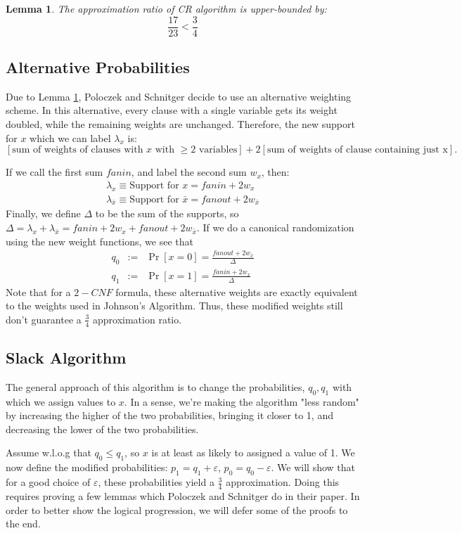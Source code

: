 \documentclass[11pt,letter]{article}
\newtheorem{lemma}{Lemma}
\begin{document}
\begin{lemma}
\label{L:1}
The approximation ratio of CR algorithm is upper-bounded by:
$$\frac{17}{23} < \frac{3}{4}$$

\end{lemma} 

\subsection{Alternative Probabilities}
Due to Lemma \ref{L:1}, Poloczek and Schnitger decide to use an alternative weighting scheme. In this alternative, every clause with a single variable gets its weight doubled, while the remaining weights are unchanged. Therefore, the new support for $x$ which we can label $\lambda_x$ is:
$$[\text{sum of weights of clauses with $x$ with $\ge 2$ variables}] + 2[\text{sum of weights of clause containing just x}].$$

If we call the first sum $fanin$, and label the second sum $w_x$, then:
\begin{eqnarray*}
\lambda_x \equiv \text{Support for } x = fanin + 2w_x\\
\lambda_{\bar{x}} \equiv \text{Support for } \bar{x} = fanout + 2w_{\bar{x}}
\end{eqnarray*}
Finally, we define $\Delta$ to be the sum of the supports, so $\Delta = \lambda_{x} + \lambda_{\bar{x}} = fanin + 2w_x + fanout + 2w_{\bar{x}}$. If we do a canonical randomization  using the new weight functions, we see that
\begin{eqnarray*}
q_0 &:=& \Pr[x=0] = \frac{fanout + 2w_{\bar{x}}}{\Delta}\\
q_1 &:=& \Pr[x=1] = \frac{fanin + 2w_x}{\Delta}
\end{eqnarray*}
Note that for a $2-CNF$ formula, these alternative weights are exactly equivalent to the weights used in Johnson's Algorithm. Thus, these modified weights still don't guarantee a $\frac{3}{4}$ approximation ratio.

\subsection{Slack Algorithm}
The general approach of this algorithm is to change the probabilities, $q_0, q_1$ with which we assign values to $x$. In a sense, we're making the algorithm "less random" by increasing the higher of the two probabilities, bringing it closer to 1, and decreasing the lower of the two probabilities.

Assume w.l.o.g that $q_0 \le q_1$, so $x$ is at least as likely to assigned a value of 1. We now define the modified probabilities: $p_1 = q_1 + \varepsilon$, $p_0 = q_0 - \varepsilon$. We will show that for a good choice of $\varepsilon$, these probabilities yield a $\frac{3}{4}$ approximation. Doing this requires proving a few lemmas which Poloczek and Schnitger do in their paper. In order to better show the logical progression, we will defer some of the proofs to the end.
\end{document}
